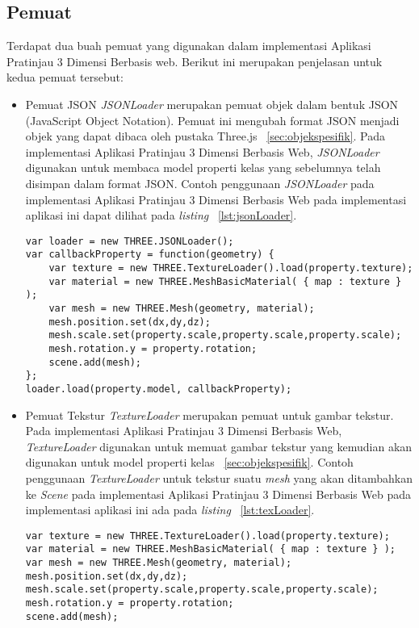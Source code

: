 \subsection{Pemuat}
Terdapat dua buah pemuat yang digunakan dalam implementasi Aplikasi Pratinjau 3 Dimensi Berbasis web. Berikut ini merupakan penjelasan untuk kedua pemuat tersebut:
\begin{itemize}
	\item {Pemuat JSON}
{\it JSONLoader} merupakan pemuat objek dalam bentuk JSON (JavaScript Object Notation). Pemuat ini mengubah format JSON menjadi objek yang dapat dibaca oleh pustaka Three.js ~\ref{sec:objekspesifik}. Pada implementasi Aplikasi Pratinjau 3 Dimensi Berbasis Web, {\it JSONLoader} digunakan untuk membaca model properti kelas yang sebelumnya telah disimpan dalam format JSON. Contoh penggunaan {\it JSONLoader} pada implementasi Aplikasi Pratinjau 3 Dimensi Berbasis Web pada implementasi aplikasi ini dapat dilihat pada {\it listing} ~\ref{lst:jsonLoader}.
\begin{lstlisting}[caption={Contoh penggunaan {\it JSONLoader}}, label={lst:jsonLoader},captionpos=b]
var loader = new THREE.JSONLoader();
var callbackProperty = function(geometry) {
	var texture = new THREE.TextureLoader().load(property.texture);
	var material = new THREE.MeshBasicMaterial( { map : texture } ); 
	var mesh = new THREE.Mesh(geometry, material);
	mesh.position.set(dx,dy,dz);
	mesh.scale.set(property.scale,property.scale,property.scale);
	mesh.rotation.y = property.rotation;
	scene.add(mesh);
};
loader.load(property.model, callbackProperty);
\end{lstlisting}

	\item {Pemuat Tekstur}
{\it TextureLoader} merupakan pemuat untuk gambar tekstur. Pada implementasi Aplikasi Pratinjau 3 Dimensi Berbasis Web, {\it TextureLoader} digunakan untuk memuat gambar tekstur yang kemudian akan digunakan untuk model properti kelas ~\ref{sec:objekspesifik}. Contoh penggunaan {\it TextureLoader} untuk tekstur suatu {\it mesh} yang akan ditambahkan ke {\it Scene} pada implementasi Aplikasi Pratinjau 3 Dimensi Berbasis Web pada implementasi aplikasi ini ada pada {\it listing} ~\ref{lst:texLoader}.
\begin{lstlisting}[caption={Contoh penggunaan {\it TextureLoader}}, label={lst:texLoader},captionpos=b]
var texture = new THREE.TextureLoader().load(property.texture);
var material = new THREE.MeshBasicMaterial( { map : texture } ); 
var mesh = new THREE.Mesh(geometry, material);
mesh.position.set(dx,dy,dz);
mesh.scale.set(property.scale,property.scale,property.scale);
mesh.rotation.y = property.rotation;
scene.add(mesh);
\end{lstlisting}
\end{itemize}

